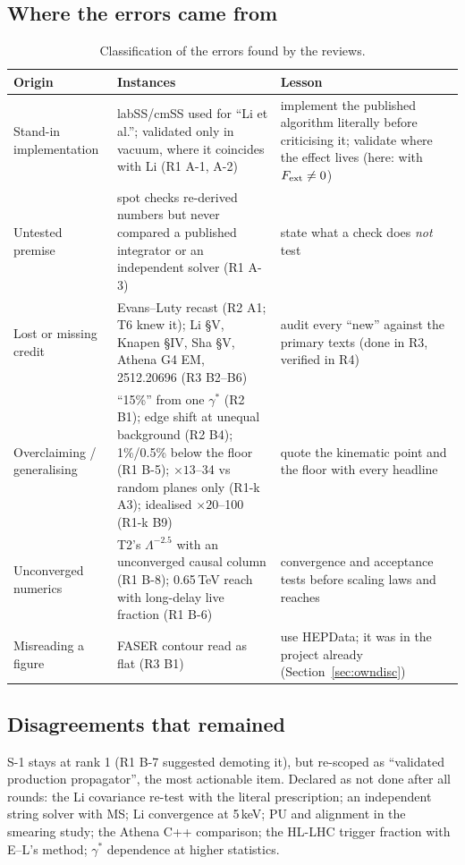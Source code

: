 \documentclass[11pt,a4paper]{article}
\newcommand{\gst}{\gamma^*}
\begin{document}
\subsection{Where the errors came from}
{\small
\begin{longtable}{@{}L{3.3cm}L{7.2cm}L{5.8cm}@{}}
\caption{Classification of the errors found by the reviews.}\label{tab:errclass}\\
\toprule Origin & Instances & Lesson\\\midrule\endfirsthead
\bottomrule\endfoot
Stand-in implementation & labSS/cmSS used for ``Li et al.''; validated only in vacuum, where it coincides with Li (R1 A-1, A-2) & implement the published algorithm literally before criticising it; validate where the effect lives (here: with $F_{\rm ext}\ne0$)\\
Untested premise & spot checks re-derived numbers but never compared a published integrator or an independent solver (R1 A-3) & state what a check does \emph{not} test\\
Lost or missing credit & Evans--Luty recast (R2 A1; T6 knew it); Li \S V, Knapen \S IV, Sha \S V, Athena G4 EM, 2512.20696 (R3 B2--B6) & audit every ``new'' against the primary texts (done in R3, verified in R4)\\
Overclaiming / generalising & ``15\%'' from one $\gst$ (R2 B1); edge shift at unequal background (R2 B4); 1\%/0.5\% below the floor (R1 B-5); $\times13$--34 vs random planes only (R1-k A3); idealised $\times20$--100 (R1-k B9) & quote the kinematic point and the floor with every headline\\
Unconverged numerics & T2's $\Lambda^{-2.5}$ with an unconverged causal column (R1 B-8); 0.65\,TeV reach with long-delay live fraction (R1 B-6) & convergence and acceptance tests before scaling laws and reaches\\
Misreading a figure & FASER contour read as flat (R3 B1) & use HEPData; it was in the project already (Section~\ref{sec:owndisc})\\
\end{longtable}
}

\subsection{Disagreements that remained}
S-1 stays at rank 1 (R1 B-7 suggested demoting it), but re-scoped as ``validated production propagator'', the most actionable item. Declared as not done after all rounds: the Li covariance re-test with the literal prescription; an independent string solver with MS; Li convergence at 5\,keV; PU and alignment in the smearing study; the Athena C++ comparison; the HL-LHC trigger fraction with E--L's method; $\gst$ dependence at higher statistics.
\end{document}
